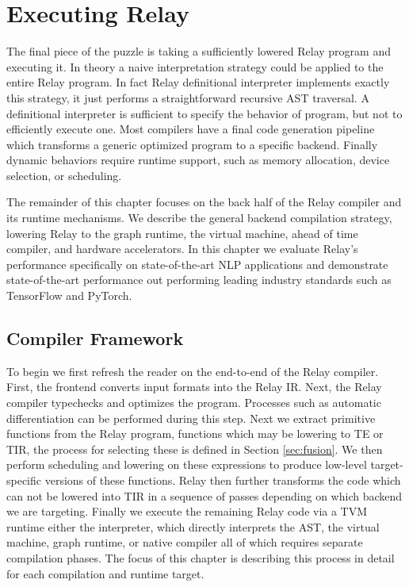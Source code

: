 \chapter{Executing Relay}
\label{ch:execute}

The final piece of the puzzle is taking a sufficiently
    lowered Relay program and executing it.
In theory a naive interpretation strategy could be applied
    to the entire Relay program.
In fact Relay definitional interpreter
  implements exactly this strategy,
  it just performs a straightforward recursive AST traversal.
A definitional interpreter is sufficient to
  specify the behavior of program, but not
  to efficiently execute one.
 Most compilers have a final code generation
  pipeline which transforms a generic optimized
  program to a specific backend.
Finally dynamic behaviors require
  runtime support, such as memory allocation,
  device selection, or scheduling.

The remainder of this chapter focuses on the back
  half of the Relay compiler and its runtime mechanisms.
We describe the general backend compilation strategy,
  lowering Relay to the graph runtime, the virtual machine,
  ahead of time compiler, and hardware accelerators.
In this chapter we evaluate Relay's performance specifically
  on state-of-the-art NLP applications and demonstrate
  state-of-the-art performance out performing leading industry standards
  such as TensorFlow and PyTorch.

\section{Compiler Framework}

To begin we first refresh the reader on the end-to-end
  of the Relay compiler.
First, the frontend converts input formats into the Relay IR.
Next, the Relay compiler typechecks and optimizes the program.
Processes such as automatic differentiation can be performed
  during this step.
Next we extract primitive functions
  from the Relay program, functions which may be lowering to TE or TIR,
  the process for selecting these
  is defined in Section \ref{sec:fusion}.
We then perform scheduling and lowering on these
  expressions to produce low-level target-specific versions
  of these functions.
Relay then further transforms the code which can not be lowered
  into TIR in a sequence of passes depending on which backend
  we are targeting.
Finally we execute the remaining Relay code via a TVM runtime
  either the interpreter, which directly interprets the AST,
  the virtual machine, graph runtime, or native compiler all
  of which requires separate compilation phases.
The focus of this chapter is describing this process in
  detail for each compilation and runtime target.

